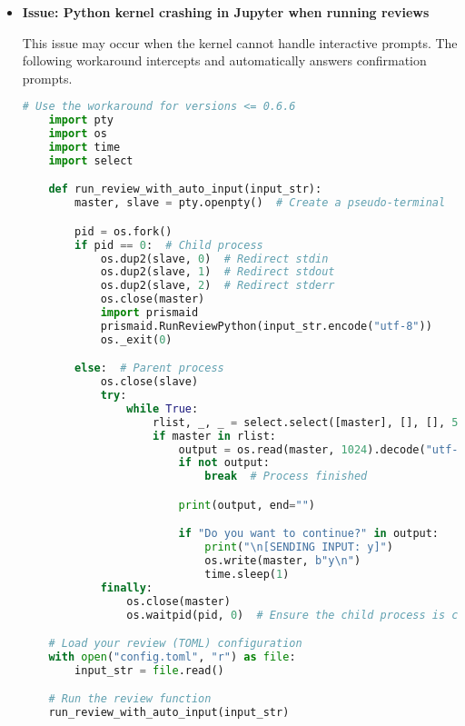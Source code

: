 \begin{itemize}
    \item \textbf{Issue: Python kernel crashing in Jupyter when running reviews}

    This issue may occur when the kernel cannot handle interactive prompts. The following workaround intercepts and automatically answers confirmation prompts.

    \begin{commandbox}
    \begin{lstlisting}[language=Python]
    # Use the workaround for versions <= 0.6.6
    import pty
    import os
    import time
    import select

    def run_review_with_auto_input(input_str):
        master, slave = pty.openpty()  # Create a pseudo-terminal

        pid = os.fork()
        if pid == 0:  # Child process
            os.dup2(slave, 0)  # Redirect stdin
            os.dup2(slave, 1)  # Redirect stdout
            os.dup2(slave, 2)  # Redirect stderr
            os.close(master)
            import prismaid
            prismaid.RunReviewPython(input_str.encode("utf-8"))
            os._exit(0)

        else:  # Parent process
            os.close(slave)
            try:
                while True:
                    rlist, _, _ = select.select([master], [], [], 5)
                    if master in rlist:
                        output = os.read(master, 1024).decode("utf-8", errors="ignore")
                        if not output:
                            break  # Process finished

                        print(output, end="")

                        if "Do you want to continue?" in output:
                            print("\n[SENDING INPUT: y]")
                            os.write(master, b"y\n")
                            time.sleep(1)
            finally:
                os.close(master)
                os.waitpid(pid, 0)  # Ensure the child process is cleaned up

    # Load your review (TOML) configuration
    with open("config.toml", "r") as file:
        input_str = file.read()

    # Run the review function
    run_review_with_auto_input(input_str)
    \end{lstlisting}
    \end{commandbox}
\end{itemize}

